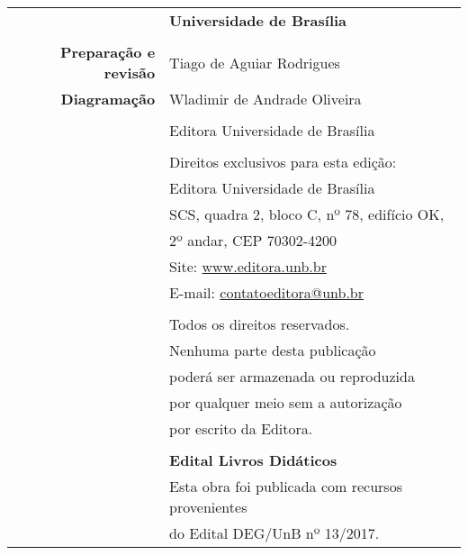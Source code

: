 \thispagestyle{empty}

\begin{center}

\begin{tabular}{r:l}
						& \textbf{\Large Universidade de Brasília}				\\
						&														\\
	{\bf Preparação e revisão} 		& Tiago de Aguiar Rodrigues					\\
	{\bf Diagramação}				& Wladimir de Andrade Oliveira				\\
						&														\\
						&  Editora Universidade de Brasília	\\
						&														\\
						& Direitos exclusivos para esta edição:					\\
						&	Editora Universidade de Brasília					\\
						&	SCS, quadra 2, bloco C, nº 78, edifício OK,			\\
						&	2º andar, CEP 70302-4200							\\
						&	Site: \url{www.editora.unb.br}						\\
						&	E-mail: \href{mailto:contatoeditora@unb.br}{contatoeditora@unb.br}	\\							&																	\\
						& Todos os direitos reservados. \\
						& Nenhuma parte desta publicação	\\														& poderá ser armazenada ou reproduzida \\
						& por qualquer meio sem a autorização \\
						& por escrito da Editora. \\
						&		\\
						& {\bf Edital Livros Didáticos}	\\
						& Esta obra foi publicada com recursos provenientes	\\
						& do Edital DEG/UnB nº 13/2017.
\end{tabular}

\end{center}

\newpage
